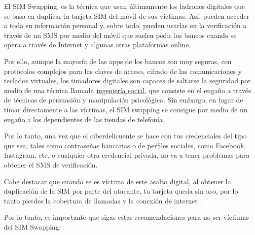 \documentclass[
  spanish,
  a4paper,
  openany]{book}
\begin{document}
El SIM Swapping, es la técnica que usan últimamente los ladrones digitales que se basa en duplicar la tarjeta SIM del móvil de sus víctimas. Así, pueden acceder a toda su información personal y, sobre todo, pueden usarlas en la verificación a través de un SMS por medio del móvil que suelen pedir los bancos cuando se opera a través de Internet y algunas otras plataformas online.

Por ello, aunque la mayoría de las apps de los bancos son muy seguras, con protocolos complejos para las claves de acceso, cifrado de las comunicaciones y teclados virtuales, los timadores digitales son capaces de saltarse la seguridad por medio de una técnica llamada \href{https://es.wikipedia.org/wiki/Ingeniería_social_(seguridad_informática)}{ingeniería social}, que consiste en el engaño a través de técnicas de persuasión y manipulación psicológica. Sin embargo, en lugar de timar directamente a las víctimas, el SIM swapping se consigue por medio de un engaño a los dependientes de las tiendas de telefonía.

Por lo tanto, una vez que el ciberdelicuente se hace con tus credenciales del tipo que sea, tales como contraseñas bancarias o de perfiles sociales, como Facebook, Instagram, etc. o cualquier otra credencial privada, no va a tener problemas para obtener el SMS de verificación.

Cabe destacar que cuando se es víctima de este asalto digital, al obtener la duplicación de la SIM por parte del atacante, tu tarjeta queda sin uso, por lo tanto pierdes la cobertura de llamadas y la conexión de internet \citep{PANDA-sim}.

Por lo tanto, es importante que sigas estas recomendaciones para no ser víctimas del SIM Swapping:
\end{document}
